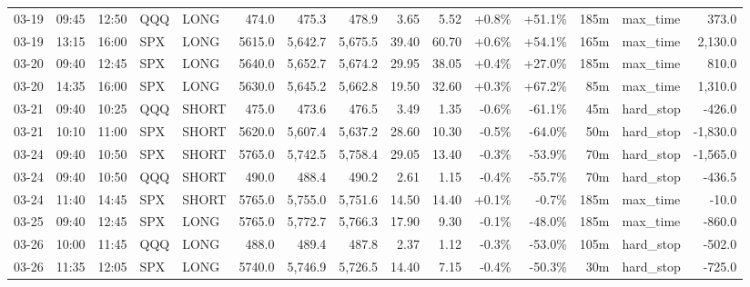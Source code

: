 \documentclass[11pt,a4paper,twoside]{article}
\begin{document}
\begin{landscape}
\begin{center}
\begin{longtable}{>{\color{txtmain}}l l l l l r r r r r r r r >{\color{txtmain}}l r}
03-19 & 09:45 & 12:50 & QQQ & LONG & 474.0 & 475.3 & 478.9 & 3.65 & 5.52 & \textcolor{wingreen}{+0.8\%} & \textcolor{wingreen}{+51.1\%} & 185m & max\_time & \textcolor{wingreen}{373.0} \\
03-19 & 13:15 & 16:00 & SPX & LONG & 5615.0 & 5,642.7 & 5,675.5 & 39.40 & 60.70 & \textcolor{wingreen}{+0.6\%} & \textcolor{wingreen}{+54.1\%} & 165m & max\_time & \textcolor{wingreen}{2,130.0} \\
03-20 & 09:40 & 12:45 & SPX & LONG & 5640.0 & 5,652.7 & 5,674.2 & 29.95 & 38.05 & \textcolor{wingreen}{+0.4\%} & \textcolor{wingreen}{+27.0\%} & 185m & max\_time & \textcolor{wingreen}{810.0} \\
03-20 & 14:35 & 16:00 & SPX & LONG & 5630.0 & 5,645.2 & 5,662.8 & 19.50 & 32.60 & \textcolor{wingreen}{+0.3\%} & \textcolor{wingreen}{+67.2\%} & 85m & max\_time & \textcolor{wingreen}{1,310.0} \\
03-21 & 09:40 & 10:25 & QQQ & SHORT & 475.0 & 473.6 & 476.5 & 3.49 & 1.35 & \textcolor{lossred}{-0.6\%} & \textcolor{lossred}{-61.1\%} & 45m & hard\_stop & \textcolor{lossred}{-426.0} \\
03-21 & 10:10 & 11:00 & SPX & SHORT & 5620.0 & 5,607.4 & 5,637.2 & 28.60 & 10.30 & \textcolor{lossred}{-0.5\%} & \textcolor{lossred}{-64.0\%} & 50m & hard\_stop & \textcolor{lossred}{-1,830.0} \\
03-24 & 09:40 & 10:50 & SPX & SHORT & 5765.0 & 5,742.5 & 5,758.4 & 29.05 & 13.40 & \textcolor{lossred}{-0.3\%} & \textcolor{lossred}{-53.9\%} & 70m & hard\_stop & \textcolor{lossred}{-1,565.0} \\
03-24 & 09:40 & 10:50 & QQQ & SHORT & 490.0 & 488.4 & 490.2 & 2.61 & 1.15 & \textcolor{lossred}{-0.4\%} & \textcolor{lossred}{-55.7\%} & 70m & hard\_stop & \textcolor{lossred}{-436.5} \\
03-24 & 11:40 & 14:45 & SPX & SHORT & 5765.0 & 5,755.0 & 5,751.6 & 14.50 & 14.40 & \textcolor{wingreen}{+0.1\%} & \textcolor{lossred}{-0.7\%} & 185m & max\_time & \textcolor{lossred}{-10.0} \\
03-25 & 09:40 & 12:45 & SPX & LONG & 5765.0 & 5,772.7 & 5,766.3 & 17.90 & 9.30 & \textcolor{lossred}{-0.1\%} & \textcolor{lossred}{-48.0\%} & 185m & max\_time & \textcolor{lossred}{-860.0} \\
03-26 & 10:00 & 11:45 & QQQ & LONG & 488.0 & 489.4 & 487.8 & 2.37 & 1.12 & \textcolor{lossred}{-0.3\%} & \textcolor{lossred}{-53.0\%} & 105m & hard\_stop & \textcolor{lossred}{-502.0} \\
03-26 & 11:35 & 12:05 & SPX & LONG & 5740.0 & 5,746.9 & 5,726.5 & 14.40 & 7.15 & \textcolor{lossred}{-0.4\%} & \textcolor{lossred}{-50.3\%} & 30m & hard\_stop & \textcolor{lossred}{-725.0} \\

\end{longtable}
\end{center}
\end{landscape}
\end{document}
